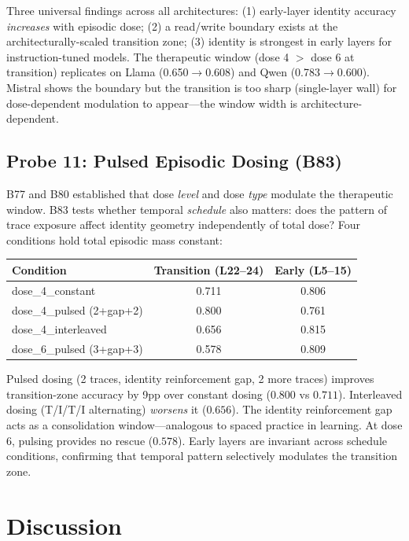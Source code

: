 \documentclass[11pt,a4paper]{article}
\begin{document}
Three universal findings across all architectures: (1) early-layer identity
accuracy \emph{increases} with episodic dose; (2) a read/write boundary
exists at the architecturally-scaled transition zone; (3) identity is
strongest in early layers for instruction-tuned models. The therapeutic
window (dose 4 $>$ dose 6 at transition) replicates on Llama
(0.650$\to$0.608) and Qwen (0.783$\to$0.600). Mistral shows the boundary
but the transition is too sharp (single-layer wall) for dose-dependent
modulation to appear---the window width is architecture-dependent.

\subsection{Probe 11: Pulsed Episodic Dosing (B83)}

B77 and B80 established that dose \emph{level} and dose \emph{type} modulate the
therapeutic window. B83 tests whether temporal \emph{schedule} also matters:
does the pattern of trace exposure affect identity geometry independently of
total dose? Four conditions hold total episodic mass constant:

\begin{center}
\begin{tabular}{lcc}
\toprule
Condition & Transition (L22--24) & Early (L5--15) \\
\midrule
dose\_4\_constant & 0.711 & 0.806 \\
dose\_4\_pulsed (2+gap+2) & 0.800 & 0.761 \\
dose\_4\_interleaved & 0.656 & 0.815 \\
dose\_6\_pulsed (3+gap+3) & 0.578 & 0.809 \\
\bottomrule
\end{tabular}
\end{center}

Pulsed dosing (2 traces, identity reinforcement gap, 2 more traces) improves
transition-zone accuracy by 9pp over constant dosing ($0.800$ vs $0.711$).
Interleaved dosing (T/I/T/I alternating) \emph{worsens} it ($0.656$). The
identity reinforcement gap acts as a consolidation window---analogous to spaced
practice in learning. At dose 6, pulsing provides no rescue ($0.578$). Early
layers are invariant across schedule conditions, confirming that temporal
pattern selectively modulates the transition zone.

\section{Discussion}
\end{document}
